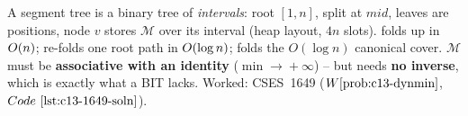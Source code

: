 \begin{recallbox}
A segment tree is a binary tree of \emph{intervals}: root \([1,n]\), split at
\(mid\), leaves are positions, node \(v\) stores \(\mathcal{M}\) over its
interval (heap layout, \(4n\) slots).   folds up in \(O(n)\);
 re-folds one root path in \(O(\log n)\);  folds the
\(O(\log n)\) canonical cover.  \(\mathcal{M}\) must be \textbf{associative with
an identity} (\(\min\!\to\!+\infty\)) -- but needs \textbf{no inverse}, which is
exactly what a BIT lacks.  Worked: CSES~1649 (\(\probref{c13-dynmin}\),
\(\coderef{c13-1649-soln}\)).
\end{recallbox}
